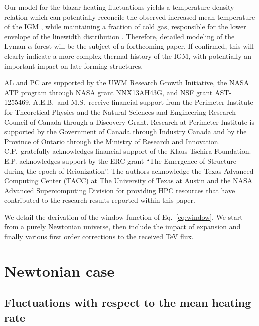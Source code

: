\documentclass[numberedappendix]{emulateapj}
\begin{document}
Our model for the blazar heating fluctuations yields a temperature-density relation which can potentially reconcile the observed increased mean temperature of the IGM \citep{2014MNRAS.441.1916B}, while maintaining a fraction of cold gas, responsible for the lower envelope of the linewidth distribution \citep{2012ApJ...757L..30R}. Therefore, detailed modeling of the Lyman $\alpha$ forest will be the subject of a forthcoming paper. If confirmed, this will clearly indicate a more complex thermal history of the IGM, with potentially an important impact on late forming structures.
\begin{acknowledgements}
AL and PC are supported by the UWM Research Growth Initiative, the NASA ATP
program through NASA grant NNX13AH43G, and NSF grant AST-1255469.
A.E.B.~and M.S.~receive financial support from the Perimeter
Institute for Theoretical Physics and the Natural Sciences and
Engineering Research Council of Canada through a Discovery Grant.
Research at Perimeter Institute is supported by the Government of
Canada through Industry Canada and by the Province of Ontario through
the Ministry of Research and Innovation.
C.P.~gratefully acknowledges
financial support of the Klaus Tschira Foundation. E.P. acknowledges support by the ERC grant ``The Emergence of Structure during the epoch of Reionization''.
The authors acknowledge the Texas Advanced Computing Center (TACC) at The University of Texas at Austin and the NASA Advanced Supercomputing Division for providing HPC resources that have contributed to the research results reported within this paper.
\end{acknowledgements}

\appendix
We detail the derivation of the window function of Eq.~\eqref{eq:window}. We start from a purely Newtonian universe, then include the impact of expansion and finally various first order corrections to the received TeV flux.\\

\section {Newtonian case}\label{sec:windon_newt}
\subsection {Fluctuations with respect to the mean heating rate}
\end{document}
